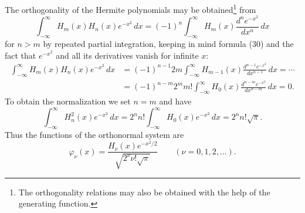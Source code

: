 The orthogonality of the Hermite polynomials may be obtained\footnote{The orthogonality relations may also be obtained with the help of the generating function.} from
\[
\int_{-\infty}^{\infty}H_m(x)H_n(x)e^{-x^2}\,dx
=(-1)^n\int_{-\infty}^{\infty}H_m(x)\frac{d^ne^{-x^2}}{dx^n}\,dx
\]
for $n>m$ by repeated partial integration, keeping in mind formula (30) and the fact that $e^{-x^2}$ and all its derivatives vanish for infinite $x$:
\[
\begin{aligned}
\int_{-\infty}^{\infty}H_m(x)H_n(x)e^{-x^2}\,dx
&=(-1)^{n-1}2m\int_{-\infty}^{\infty}H_{m-1}(x)\frac{d^{n-1}e^{-x^2}}{dx^{n-1}}\,dx=\cdots\\
&=(-1)^{n-m}2^m m!\int_{-\infty}^{\infty}H_0(x)\frac{d^{n-m}e^{-x^2}}{dx^{n-m}}\,dx=0.
\end{aligned}
\]
To obtain the normalization we set $n=m$ and have
\[
\int_{-\infty}^{\infty}H_n^2(x)e^{-x^2}\,dx
=2^n n!\int_{-\infty}^{\infty}H_0(x)e^{-x^2}\,dx
=2^n n!\sqrt\pi.
\]
Thus the functions of the orthonormal system are
\[
\varphi_\nu(x)=\frac{H_\nu(x)e^{-x^2/2}}{\sqrt{2^\nu\nu!\sqrt\pi}}
\qquad(\nu=0,1,2,\ldots).
\]

